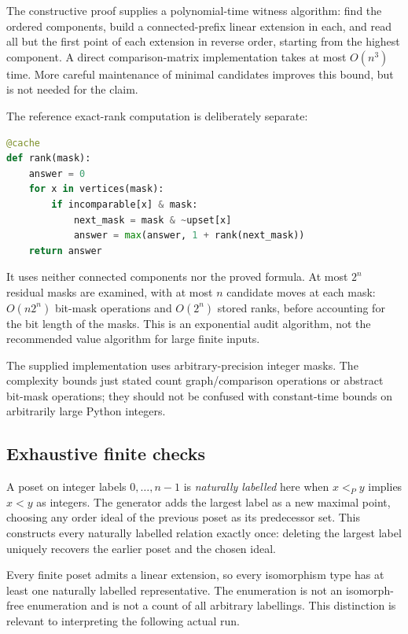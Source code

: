 \documentclass[11pt,a4paper]{article}
\theoremstyle{definition}
\theoremstyle{remark}
\begin{document}
The constructive proof supplies a polynomial-time witness algorithm:
find the ordered components, build a connected-prefix linear extension in
each, and read all but the first point of each extension in reverse order,
starting from the highest component. A direct comparison-matrix
implementation takes at most $O(n^3)$ time. More careful maintenance of
minimal candidates improves this bound, but is not needed for the claim.

The reference exact-rank computation is deliberately separate:
\begin{lstlisting}[language=Python]
@cache
def rank(mask):
    answer = 0
    for x in vertices(mask):
        if incomparable[x] & mask:
            next_mask = mask & ~upset[x]
            answer = max(answer, 1 + rank(next_mask))
    return answer
\end{lstlisting}
It uses neither connected components nor the proved formula. At most $2^n$
residual masks are examined, with at most $n$ candidate moves at each mask:
$O(n2^n)$ bit-mask operations and $O(2^n)$ stored ranks, before accounting
for the bit length of the masks. This is an exponential audit algorithm,
not the recommended value algorithm for large finite inputs.

The supplied implementation uses arbitrary-precision integer masks. The
complexity bounds just stated count graph/comparison operations or abstract
bit-mask operations; they should not be confused with constant-time bounds
on arbitrarily large Python integers.

\subsection{Exhaustive finite checks}

A poset on integer labels $0,\ldots,n-1$ is \emph{naturally labelled} here
when $x<_P y$ implies $x<y$ as integers. The generator adds the largest label
as a new maximal point, choosing any order ideal of the previous poset as
its predecessor set. This constructs every naturally labelled relation
exactly once: deleting the largest label uniquely recovers the earlier
poset and the chosen ideal.

Every finite poset admits a linear extension, so every isomorphism type has
at least one naturally labelled representative. The enumeration is not an
isomorph-free enumeration and is not a count of all arbitrary labellings.
This distinction is relevant to interpreting the following actual run.
\end{document}
